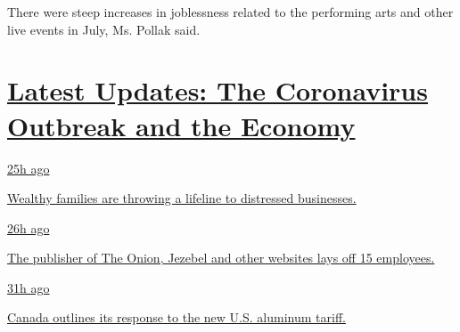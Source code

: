 There were steep increases in joblessness related to the performing arts
and other live events in July, Ms. Pollak said.

\hypertarget{latest-updates-the-coronavirus-outbreak-and-the-economy}{%
\section{\texorpdfstring{\href{https://www.nytimes.com/live/2020/08/07/business/stock-market-today-coronavirus?action=click\&pgtype=Article\&state=default\&region=MAIN_CONTENT_1\&context=storylines_live_updates}{Latest
Updates: The Coronavirus Outbreak and the
Economy}}{Latest Updates: The Coronavirus Outbreak and the Economy}}\label{latest-updates-the-coronavirus-outbreak-and-the-economy}}

\href{https://www.nytimes.com/live/2020/08/07/business/stock-market-today-coronavirus?action=click\&pgtype=Article\&state=default\&region=MAIN_CONTENT_1\&context=storylines_live_updates\#wealthy-families-are-throwing-a-lifeline-to-distressed-businesses}{25h
ago}

\href{https://www.nytimes.com/live/2020/08/07/business/stock-market-today-coronavirus?action=click\&pgtype=Article\&state=default\&region=MAIN_CONTENT_1\&context=storylines_live_updates\#wealthy-families-are-throwing-a-lifeline-to-distressed-businesses}{Wealthy
families are throwing a lifeline to distressed businesses.}

\href{https://www.nytimes.com/live/2020/08/07/business/stock-market-today-coronavirus?action=click\&pgtype=Article\&state=default\&region=MAIN_CONTENT_1\&context=storylines_live_updates\#the-publisher-of-the-onion-jezebel-and-other-websites-lays-off-15-employees}{26h
ago}

\href{https://www.nytimes.com/live/2020/08/07/business/stock-market-today-coronavirus?action=click\&pgtype=Article\&state=default\&region=MAIN_CONTENT_1\&context=storylines_live_updates\#the-publisher-of-the-onion-jezebel-and-other-websites-lays-off-15-employees}{The
publisher of The Onion, Jezebel and other websites lays off 15
employees.}

\href{https://www.nytimes.com/live/2020/08/07/business/stock-market-today-coronavirus?action=click\&pgtype=Article\&state=default\&region=MAIN_CONTENT_1\&context=storylines_live_updates\#canada-outlines-its-response-to-the-new-us-aluminum-tariff}{31h
ago}

\href{https://www.nytimes.com/live/2020/08/07/business/stock-market-today-coronavirus?action=click\&pgtype=Article\&state=default\&region=MAIN_CONTENT_1\&context=storylines_live_updates\#canada-outlines-its-response-to-the-new-us-aluminum-tariff}{Canada
outlines its response to the new U.S. aluminum tariff.}

